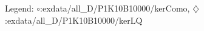 Legend: {\color{CornflowerBlue}$\circ$}:exdata/all\_D/P1K10B10000/kerComo, {\color{Orange}$\diamondsuit$}:exdata/all\_D/P1K10B10000/kerLQ